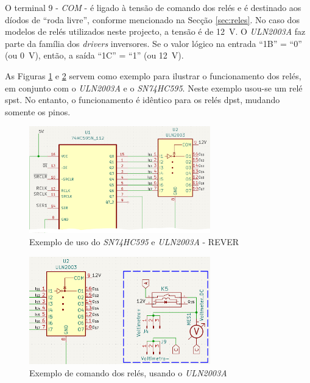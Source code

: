 O terminal 9 - \textit{COM} - é ligado à tensão de comando dos relés e é destinado aos díodos de ``roda livre'', conforme mencionado na Secção \ref{sec:reles}. No caso dos modelos de relés utilizados neste projecto, a tensão é de \SI{12}{\volt}.
O \textit{ULN2003A} faz parte da família dos \textit{drivers} inversores. Se o valor lógico na entrada ``1B'' = ``0'' (ou \SI{0}{\volt}), então, a saída ``1C'' = ``1'' (ou \SI{12}{\volt}).

As Figuras \ref{fig:comandorelesfull} e \ref{fig:exemplovoltimetro} servem como exemplo para ilustrar o funcionamento dos relés, em conjunto com o \textit{ULN2003A} e o \textit{SN74HC595}. Neste exemplo usou-se um relé \acrshort{spst}. No entanto, o funcionamento é idêntico para os relés \acrshort{dpst}, mudando somente os pinos.

\begin{figure}[hbtp]
	\centering
	\includegraphics[width=0.7\textwidth]{figures/comandoreles_FULL.png}
	\caption{Exemplo de uso do \textit{SN74HC595} e \textit{ULN2003A} - REVER}
	\label{fig:comandorelesfull}
\end{figure}

\begin{figure}[hbtp]
	\centering
	\includegraphics[width=0.7\textwidth]{figures/exemplo_voltimetro.png}
	\caption{Exemplo de comando dos relés, usando o \textit{ULN2003A}}
	\label{fig:exemplovoltimetro}
\end{figure}

